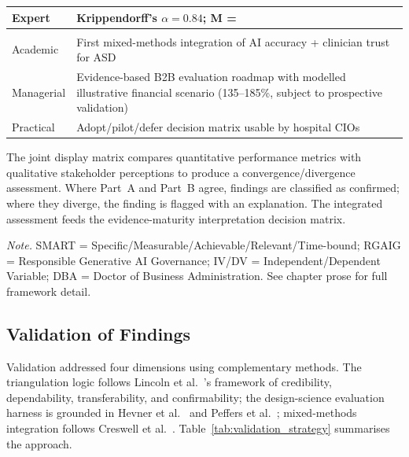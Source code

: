 {\begin{xltabular}{\textwidth}{@{} >{\raggedright\arraybackslash}p{2.5cm} L @{}}
Expert & Krippendorff's $\alpha = 0.84$; M = \expertM{} \\
\midrule
{} \\
\addlinespace
Academic & First mixed-methods integration of AI accuracy + clinician trust for ASD \\
Managerial & Evidence-based B2B evaluation roadmap with modelled illustrative financial scenario (135--185\%, subject to prospective validation) \\
Practical & Adopt/pilot/defer decision matrix usable by hospital CIOs \\
\end{xltabular}} The joint display matrix compares quantitative performance metrics with qualitative stakeholder perceptions to produce a convergence/divergence assessment. Where Part~A and Part~B agree, findings are classified as confirmed; where they diverge, the finding is flagged with an explanation. The integrated assessment feeds the evidence-maturity interpretation decision matrix.

\vspace{0.3em}\noindent\textit{Note.} SMART = Specific/Measurable/Achievable/Relevant/Time-bound; RGAIG = Responsible Generative AI Governance; IV/DV = Independent/Dependent Variable; DBA = Doctor of Business Administration. See chapter prose for full framework detail.

\subsection{Validation of Findings}

Validation addressed four dimensions using complementary methods. The triangulation logic follows Lincoln et al.~\cite{lincoln1985naturalistic}'s framework of credibility, dependability, transferability, and confirmability; the design-science evaluation harness is grounded in Hevner et al.~\cite{hevner2004design} and Peffers et al.~\cite{peffers2007dsr}; mixed-methods integration follows Creswell et al.~\cite{creswell2017research}. Table~\ref{tab:validation_strategy} summarises the approach.

